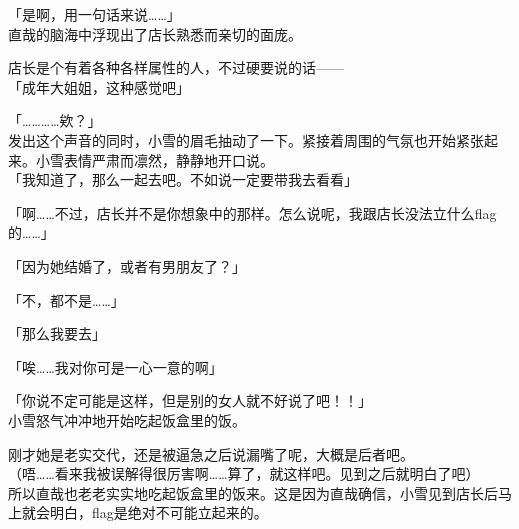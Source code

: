 「是啊，用一句话来说……」\\

直哉的脑海中浮现出了店长熟悉而亲切的面庞。

店长是个有着各种各样属性的人，不过硬要说的话——\\

「成年大姐姐，这种感觉吧」

「…………欸？」\\

发出这个声音的同时，小雪的眉毛抽动了一下。紧接着周围的气氛也开始紧张起来。小雪表情严肃而凛然，静静地开口说。\\

「我知道了，那么一起去吧。不如说一定要带我去看看」

「啊……不过，店长并不是你想象中的那样。怎么说呢，我跟店长没法立什么flag的……」

「因为她结婚了，或者有男朋友了？」

「不，都不是……」

「那么我要去」

「唉……我对你可是一心一意的啊」

「你说不定可能是这样，但是别的女人就不好说了吧！！」\\

小雪怒气冲冲地开始吃起饭盒里的饭。

刚才她是老实交代，还是被逼急之后说漏嘴了呢，大概是后者吧。\\

（唔……看来我被误解得很厉害啊……算了，就这样吧。见到之后就明白了吧）\\

所以直哉也老老实实地吃起饭盒里的饭来。这是因为直哉确信，小雪见到店长后马上就会明白，flag是绝对不可能立起来的。
